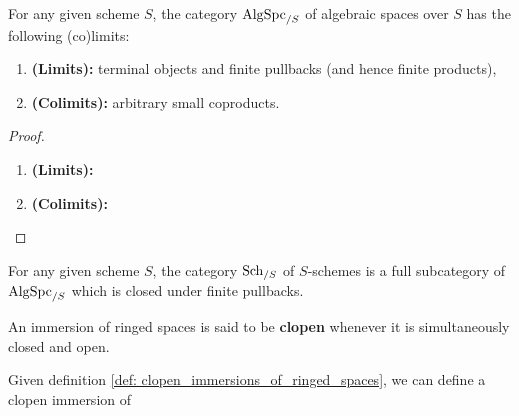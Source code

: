             \begin{proposition} \label{prop: (co)limits_of_algebraic_spaces}
                For any given scheme $S$, the category $\mathrm{Alg}\mathrm{Spc}_{/S}$ of algebraic spaces over $S$ has the following (co)limits:
                    \begin{enumerate}
                        \item \textbf{(Limits):} terminal objects and finite pullbacks (and hence finite products),
                        \item \textbf{(Colimits):} arbitrary small coproducts.
                    \end{enumerate}
            \end{proposition}
                \begin{proof}
                    \noindent
                    \begin{enumerate}
                        \item \textbf{(Limits):} 
                        \item \textbf{(Colimits):} 
                    \end{enumerate}
                \end{proof}
            \begin{corollary} \label{coro: schemes_are_algebraic_spaces}
                For any given scheme $S$, the category $\mathrm{Sch}_{/S}$ of $S$-schemes is a full subcategory of $\mathrm{Alg}\mathrm{Spc}_{/S}$ which is closed under finite pullbacks.
            \end{corollary}
            \begin{definition} \label{def: clopen_immersions_of_ringed_spaces}
                An immersion of ringed spaces is said to be \textbf{clopen} whenever it is simultaneously closed and open.
            \end{definition}
            \begin{remark} \label{remark: clopen_immersions_of_fppf_sheaves}
                Given definition \ref{def: clopen_immersions_of_ringed_spaces}, we can define a clopen immersion of 
            \end{remark}
